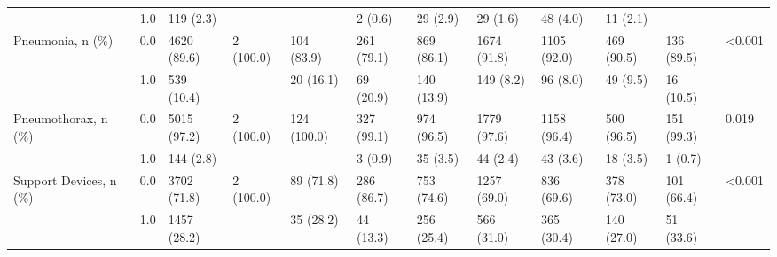 \begin{tabular}{llllllllllll}
                       & 1.0 &             119 (2.3) &            &              &     2 (0.6) &    29 (2.9) &     29 (1.6) &     48 (4.0) &    11 (2.1) &              &         \\
Pneumonia, n (\%) & 0.0 &           4620 (89.6) &  2 (100.0) &   104 (83.9) &  261 (79.1) &  869 (86.1) &  1674 (91.8) &  1105 (92.0) &  469 (90.5) &   136 (89.5) &  <0.001 \\
                       & 1.0 &            539 (10.4) &            &    20 (16.1) &   69 (20.9) &  140 (13.9) &    149 (8.2) &     96 (8.0) &    49 (9.5) &    16 (10.5) &         \\
Pneumothorax, n (\%) & 0.0 &           5015 (97.2) &  2 (100.0) &  124 (100.0) &  327 (99.1) &  974 (96.5) &  1779 (97.6) &  1158 (96.4) &  500 (96.5) &   151 (99.3) &   0.019 \\
                       & 1.0 &             144 (2.8) &            &              &     3 (0.9) &    35 (3.5) &     44 (2.4) &     43 (3.6) &    18 (3.5) &      1 (0.7) &         \\
Support Devices, n (\%) & 0.0 &           3702 (71.8) &  2 (100.0) &    89 (71.8) &  286 (86.7) &  753 (74.6) &  1257 (69.0) &   836 (69.6) &  378 (73.0) &   101 (66.4) &  <0.001 \\
                       & 1.0 &           1457 (28.2) &            &    35 (28.2) &   44 (13.3) &  256 (25.4) &   566 (31.0) &   365 (30.4) &  140 (27.0) &    51 (33.6) &         \\
\bottomrule
\end{tabular}
